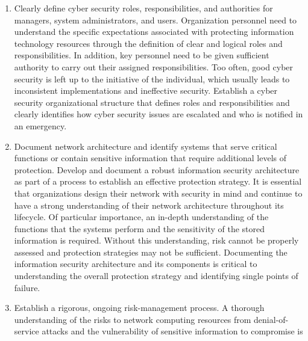 \documentclass{article}
\begin{document}
\begin{enumerate}
\item
  Clearly define cyber security roles, responsibilities, and authorities
  for managers, system administrators, and users. Organization personnel
  need to understand the specific expectations associated with
  protecting information technology resources through the definition of
  clear and logical roles and responsibilities. In addition, key
  personnel need to be given sufficient authority to carry out their
  assigned responsibilities. Too often, good cyber security is left up
  to the initiative of the individual, which usually leads to
  inconsistent implementations and ineffective security. Establish a
  cyber security organizational structure that defines roles and
  responsibilities and clearly identifies how cyber security issues are
  escalated and who is notified in an emergency.
\item
  Document network architecture and identify systems that serve critical
  functions or contain sensitive information that require additional
  levels of protection. Develop and document a robust information
  security architecture as part of a process to establish an effective
  protection strategy. It is essential that organizations design their
  network with security in mind and continue to have a strong
  understanding of their network architecture throughout its lifecycle.
  Of particular importance, an in-depth understanding of the functions
  that the systems perform and the sensitivity of the stored information
  is required. Without this understanding, risk cannot be properly
  assessed and protection strategies may not be sufficient. Documenting
  the information security architecture and its components is critical
  to understanding the overall protection strategy and identifying
  single points of failure.
\item
  Establish a rigorous, ongoing risk-management process. A thorough
  understanding of the risks to network computing resources from
  denial-of-service attacks and the vulnerability of sensitive
  information to compromise is
\end{enumerate}
\end{document}

